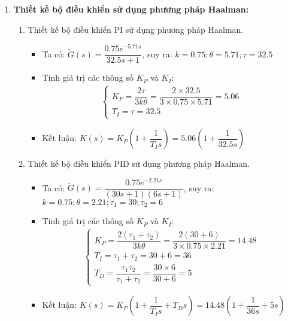 \begin{solution}
\begin{enumerate}
        \item \textbf{Thiết kế bộ điều khiển sử dụng phương pháp Haalman:}
            \begin{enumerate}
                \item Thiết kế bộ điều khiển PI sử dụng phương pháp Haalman.
                    \begin{itemize}
                        \item Ta có: $\tilde{G}(s) = \dfrac{0.75e^{-5.71s}}{32.5s + 1}$, suy ra: $k = 0.75; \theta = 5.71; \tau = 32.5$
                        \item Tính giá trị các thông số $K_P$ và $K_I$:
                            \begin{align*}
                                \left\{\begin{array}{l}
                                    K_P = \dfrac{2 \tau}{3 k \theta} = \dfrac{2 \times 32.5}{3 \times 0.75 \times 5.71} = 5.06\\
                                    T_I = \tau = 32.5
                                \end{array}\right.
                            \end{align*}
                        \item Kết luận: $K(s) = K_P \left({1 + \dfrac{1}{T_I s}}\right) = 5.06 \left({1 + \dfrac{1}{32.5 s}}\right)$
                    \end{itemize}
                \item Thiết kế bộ điều khiển PID sử dụng phương pháp Haalman.
                    \begin{itemize}
                        \item Ta có: $\tilde{G}(s) = \dfrac{0.75 e^{-2.21 s}}{\left({30s + 1}\right) \left({6s + 1}\right)}$, suy ra: $k = 0.75; \theta = 2.21; \tau_1 = 30; \tau_2 = 6$
                        \item Tính giá trị các thông số $K_P$ và $K_I$:
                            \begin{align*}
                                \left\{\begin{array}{l}
                                    K_P = \dfrac{2 \left({\tau_1 + \tau_2}\right)}{3 k \theta} = \dfrac{2 \left({30 + 6}\right)}{3 \times 0.75 \times 2.21} = 14.48 \\
                                    T_I = \tau_1 + \tau_2 = 30 + 6 = 36 \\
                                    T_D = \dfrac{\tau_1 \tau_2}{\tau_1 + \tau_2} = \dfrac{30 \times 6}{30 + 6} = 5
                                \end{array}\right.
                            \end{align*}
                        \item Kết luận: $K(s) = K_P \left({1 + \dfrac{1}{T_I s} + T_D s}\right) = 14.48 \left({1 + \dfrac{1}{36s} + 5s}\right)$
                    \end{itemize}
            \end{enumerate}


\end{enumerate}
\end{solution}
